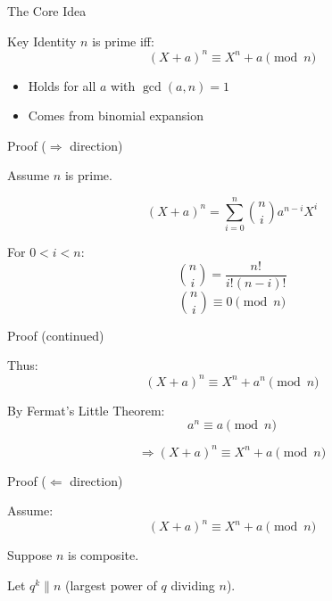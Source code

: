 \documentclass{beamer}
\begin{document}
\begin{frame}{The Core Idea}

\begin{block}{Key Identity}
$n$ is prime iff:
\[
(X+a)^n \equiv X^n + a \pmod{n}
\]
\end{block}


\begin{itemize}
    \item Holds for all $a$ with $\gcd(a,n)=1$
    \item Comes from binomial expansion
\end{itemize}

\end{frame}


\begin{frame}{Proof ($\Rightarrow$ direction)}

Assume $n$ is prime.

\vspace{0.5em}

\[
(X+a)^n = \sum_{i=0}^{n} \binom{n}{i} a^{n-i} X^i
\]

\vspace{0.5em}

For $0 < i < n$:
\[
\binom{n}{i} = \frac{n!}{i!(n-i)!}
\]
\[
\binom{n}{i} \equiv 0 \pmod{n}
\]

\end{frame}


\begin{frame}{Proof (continued)}

Thus:
\[
(X+a)^n \equiv X^n + a^n \pmod{n}
\]


By Fermat's Little Theorem:
\[
a^n \equiv a \pmod{n}
\]


\[
\Rightarrow (X+a)^n \equiv X^n + a \pmod{n}
\]

\end{frame}


\begin{frame}{Proof ($\Leftarrow$ direction)}

Assume:
\[
(X+a)^n \equiv X^n + a \pmod{n}
\]


Suppose $n$ is composite.

Let $q^k \parallel n$ (largest power of $q$ dividing $n$).

\end{frame}
\end{document}
